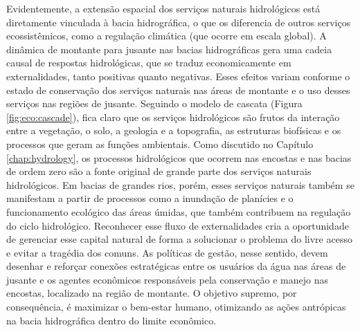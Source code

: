 \documentclass[./main.tex]{subfiles}
\begin{document}
\par Evidentemente, a extensão espacial dos serviços naturais hidrológicos está diretamente vinculada à bacia hidrográfica, o que os diferencia de outros serviços ecossistêmicos, como a regulação climática (que ocorre em escala global). A dinâmica de montante para jusante nas bacias hidrográficas gera uma cadeia causal de respostas hidrológicas, que se traduz economicamente em externalidades, tanto positivas quanto negativas. Esses efeitos variam conforme o estado de conservação dos serviços naturais nas áreas de montante e o uso desses serviços nas regiões de jusante. Seguindo o modelo de cascata (Figura \ref{fig:eco:cascade}), fica claro que os serviços hidrológicos são frutos da interação entre a vegetação, o solo, a geologia e a topografia, as estruturas biofísicas e os processos que geram as funções ambientais. Como discutido no Capítulo \ref{chap:hydrology}, os processos hidrológicos que ocorrem nas encostas e nas bacias de ordem zero são a fonte original de grande parte dos serviços naturais hidrológicos. Em bacias de grandes rios, porém, esses serviços naturais também se manifestam a partir de processos como a inundação de planícies e o funcionamento ecológico das áreas úmidas, que também contribuem na regulação do ciclo hidrológico. Reconhecer esse fluxo de externalidades cria a oportunidade de gerenciar esse capital natural de forma a solucionar o problema do livre acesso e evitar a tragédia dos comuns. As políticas de gestão, nesse sentido, devem desenhar e reforçar conexões estratégicas entre os usuários da água nas áreas de jusante e os agentes econômicos responsáveis pela conservação e manejo nas encostas, localizado na região de montante. O objetivo supremo, por consequência, é maximizar o bem-estar humano, otimizando as ações antrópicas na bacia hidrográfica dentro do limite econômico.
\end{document}
